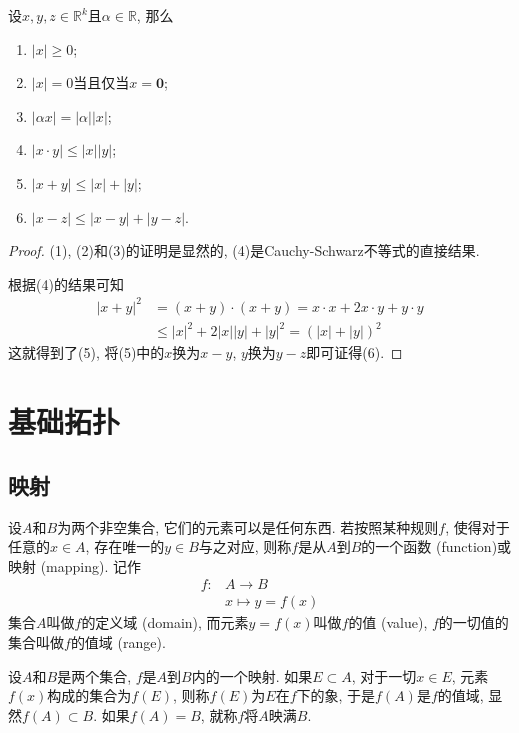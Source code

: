 \documentclass[cn,12pt,math=mtpro2,citestyle=gb7714-2015,bibstyle=gb7714-2015,twocol]{elegantbook}
\newcommand{\R}{\mathbb{R}}
\begin{document}
\begin{theorem}\label{thm:th11}
  设$x, y, z\in\R^k$且$\alpha\in\R$, 那么
\begin{enumerate}[label=(\arabic*)]
  \item $|x|\geq 0$;
  \item $|x|=0$当且仅当$x=\mathbold{0}$;
  \item $|\alpha x|=|\alpha||x|$;
  \item $|x\cdot y |\leq |x||y|$;
  \item $|x+y |\leq|x|+|y |$;
  \item $|x-z|\leq |x-y |+|y-z|$.
\end{enumerate}
\end{theorem}
\begin{proof}
  (1), (2)和(3)的证明是显然的, (4)是Cauchy-Schwarz不等式的直接结果.

  根据(4)的结果可知
  \begin{align*}
  |x+y |^2&=(x+y)\cdot(x+y)=x\cdot x+2x\cdot y +y\cdot y  \\
  &\leq |x|^2+2|x||y|+|y|^2=(|x|+|y|)^2
  \end{align*}
  这就得到了(5), 将(5)中的$x$换为$x-y $, $y$换为$y-z$即可证得(6).
\end{proof}

\chapter{基础拓扑}
\section{映射}
\begin{definition}
设$A$和$B$为两个非空集合, 它们的元素可以是任何东西. 若按照某种规则$f$, 使得对于任意的$x\in A$, 存在唯一的$y\in B$与之对应, 则称$f$是从$A$到$B$的一个函数 (function)或映射 (mapping). 记作
\begin{align*}
f:&A\rightarrow B \\
&x\mapsto y=f(x)
\end{align*}
集合$A$叫做$f$的定义域 (domain), 而元素$y=f(x)$叫做$f$的值 (value), $f$的一切值的集合叫做$f$的值域 (range).
\end{definition}

\begin{definition}
设$A$和$B$是两个集合, $f$是$A$到$B$内的一个映射. 如果$E\subset A$, 对于一切$x\in E$, 元素$f(x)$构成的集合为$f(E)$, 则称$f(E)$为$E$在$f$下的象, 于是$f(A)$是$f$的值域, 显然$f(A)\subset B$. 如果$f(A)=B$, 就称$f$将$A$映满$B$.
\end{definition}
\end{document}
